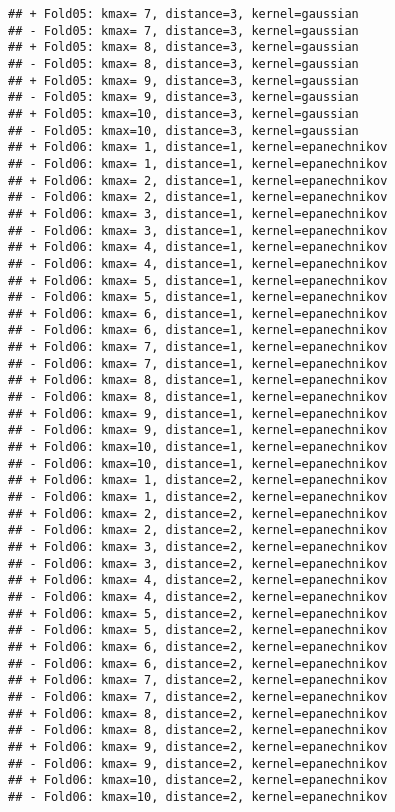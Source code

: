 \documentclass[
]{article}
\begin{document}
\begin{verbatim}
## + Fold05: kmax= 7, distance=3, kernel=gaussian 
## - Fold05: kmax= 7, distance=3, kernel=gaussian 
## + Fold05: kmax= 8, distance=3, kernel=gaussian 
## - Fold05: kmax= 8, distance=3, kernel=gaussian 
## + Fold05: kmax= 9, distance=3, kernel=gaussian 
## - Fold05: kmax= 9, distance=3, kernel=gaussian 
## + Fold05: kmax=10, distance=3, kernel=gaussian 
## - Fold05: kmax=10, distance=3, kernel=gaussian 
## + Fold06: kmax= 1, distance=1, kernel=epanechnikov 
## - Fold06: kmax= 1, distance=1, kernel=epanechnikov 
## + Fold06: kmax= 2, distance=1, kernel=epanechnikov 
## - Fold06: kmax= 2, distance=1, kernel=epanechnikov 
## + Fold06: kmax= 3, distance=1, kernel=epanechnikov 
## - Fold06: kmax= 3, distance=1, kernel=epanechnikov 
## + Fold06: kmax= 4, distance=1, kernel=epanechnikov 
## - Fold06: kmax= 4, distance=1, kernel=epanechnikov 
## + Fold06: kmax= 5, distance=1, kernel=epanechnikov 
## - Fold06: kmax= 5, distance=1, kernel=epanechnikov 
## + Fold06: kmax= 6, distance=1, kernel=epanechnikov 
## - Fold06: kmax= 6, distance=1, kernel=epanechnikov 
## + Fold06: kmax= 7, distance=1, kernel=epanechnikov 
## - Fold06: kmax= 7, distance=1, kernel=epanechnikov 
## + Fold06: kmax= 8, distance=1, kernel=epanechnikov 
## - Fold06: kmax= 8, distance=1, kernel=epanechnikov 
## + Fold06: kmax= 9, distance=1, kernel=epanechnikov 
## - Fold06: kmax= 9, distance=1, kernel=epanechnikov 
## + Fold06: kmax=10, distance=1, kernel=epanechnikov 
## - Fold06: kmax=10, distance=1, kernel=epanechnikov 
## + Fold06: kmax= 1, distance=2, kernel=epanechnikov 
## - Fold06: kmax= 1, distance=2, kernel=epanechnikov 
## + Fold06: kmax= 2, distance=2, kernel=epanechnikov 
## - Fold06: kmax= 2, distance=2, kernel=epanechnikov 
## + Fold06: kmax= 3, distance=2, kernel=epanechnikov 
## - Fold06: kmax= 3, distance=2, kernel=epanechnikov 
## + Fold06: kmax= 4, distance=2, kernel=epanechnikov 
## - Fold06: kmax= 4, distance=2, kernel=epanechnikov 
## + Fold06: kmax= 5, distance=2, kernel=epanechnikov 
## - Fold06: kmax= 5, distance=2, kernel=epanechnikov 
## + Fold06: kmax= 6, distance=2, kernel=epanechnikov 
## - Fold06: kmax= 6, distance=2, kernel=epanechnikov 
## + Fold06: kmax= 7, distance=2, kernel=epanechnikov 
## - Fold06: kmax= 7, distance=2, kernel=epanechnikov 
## + Fold06: kmax= 8, distance=2, kernel=epanechnikov 
## - Fold06: kmax= 8, distance=2, kernel=epanechnikov 
## + Fold06: kmax= 9, distance=2, kernel=epanechnikov 
## - Fold06: kmax= 9, distance=2, kernel=epanechnikov 
## + Fold06: kmax=10, distance=2, kernel=epanechnikov 
## - Fold06: kmax=10, distance=2, kernel=epanechnikov 

\end{verbatim}
\end{document}
